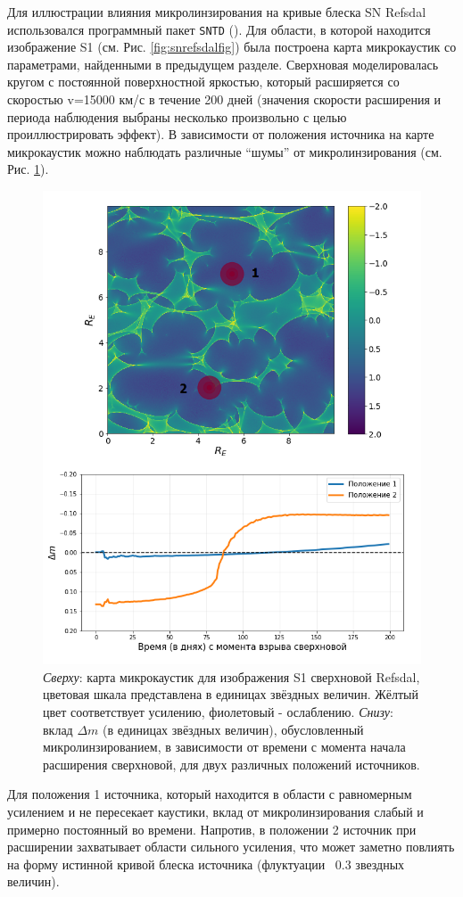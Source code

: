 Для иллюстрации влияния микролинзирования на кривые блеска SN Refsdal использовался программный пакет {\tt{SNTD}} (\cite{pierelrodney2019}). Для области, в которой находится изображение S1 (см. Рис. \ref{fig:snrefsdalfig}) была построена карта микрокаустик со параметрами, найденными в предыдущем разделе. Сверхновая моделировалась кругом с постоянной поверхностной яркостью, который расширяется со скоростью v=15000 км/с в течение 200 дней (значения скорости расширения и периода наблюдения выбраны несколько произвольно с целью проиллюстрировать эффект). В зависимости от положения источника на карте микрокаустик можно наблюдать различные “шумы” от микролинзирования (см. Рис. \ref{fig:sntd_example}).

\begin{figure}[H]
    \centering
	\includegraphics[scale=0.75]{pics/sntd_example.png}
	\caption{\textit{Сверху}: карта микрокаустик для изображения S1 сверхновой Refsdal, цветовая шкала представлена в единицах звёздных величин. Жёлтый цвет соответствует усилению, фиолетовый - ослаблению. \textit{Снизу}: вклад $\Delta m$ (в единицах звёздных величин), обусловленный микролинзированием, в зависимости от времени с момента начала расширения сверхновой, для двух различных положений источников. \label{fig:sntd_example}} 
\end{figure}

Для положения 1 источника, который находится в области с равномерным усилением и не пересекает каустики, вклад от микролинзирования слабый и примерно постоянный во времени. Напротив, в положении 2 источник при расширении захватывает области сильного усиления, что может заметно повлиять на форму истинной кривой блеска источника (флуктуации ~0.3 звездных величин). 